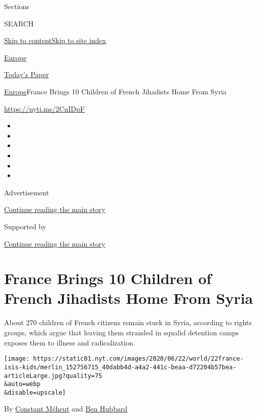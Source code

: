 Sections

SEARCH

\protect\hyperlink{site-content}{Skip to
content}\protect\hyperlink{site-index}{Skip to site index}

\href{https://www.nytimes.com/section/world/europe}{Europe}

\href{https://myaccount.nytimes.com/auth/login?response_type=cookie\&client_id=vi}{}

\href{https://www.nytimes.com/section/todayspaper}{Today's Paper}

\href{/section/world/europe}{Europe}\textbar{}France Brings 10 Children
of French Jihadists Home From Syria

\url{https://nyti.ms/2CnIDpF}

\begin{itemize}
\item
\item
\item
\item
\item
\item
\end{itemize}

Advertisement

\protect\hyperlink{after-top}{Continue reading the main story}

Supported by

\protect\hyperlink{after-sponsor}{Continue reading the main story}

\hypertarget{france-brings-10-children-of-french-jihadists-home-from-syria}{%
\section{France Brings 10 Children of French Jihadists Home From
Syria}\label{france-brings-10-children-of-french-jihadists-home-from-syria}}

About 270 children of French citizens remain stuck in Syria, according
to rights groups, which argue that leaving them stranded in squalid
detention camps exposes them to illness and radicalization.

\texttt{[image: https://static01.nyt.com/images/2020/06/22/world/22france-isis-kids/merlin\_152756715\_40dabb4d-a4a2-441c-beaa-d72204b57bea-articleLarge.jpg?quality=75\\\&auto=webp\\\&disable=upscale]}

By \href{https://www.nytimes.com/by/constant-meheut}{Constant Méheut}
and \href{https://www.nytimes.com/by/ben-hubbard}{Ben Hubbard}

